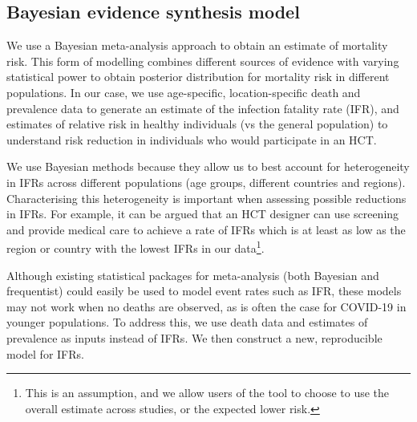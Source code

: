 \documentclass{article}
\begin{document}
\subsection{Bayesian evidence synthesis model}

We use a Bayesian meta-analysis approach to obtain an estimate of mortality risk. This form of modelling combines different sources of evidence with varying statistical power to obtain posterior distribution for mortality risk in different populations. In our case, we use age-specific, location-specific death and prevalence data to generate an estimate of the infection fatality rate (IFR), and estimates of relative risk in healthy individuals (vs the general population) to understand risk reduction in individuals who would participate in an HCT. 

We use Bayesian methods because they allow us to best account for heterogeneity in IFRs across different populations (age groups, different countries and regions). Characterising this heterogeneity is important when assessing possible reductions in IFRs. For example, it can be argued that an HCT designer can use screening and provide medical care to achieve a rate of IFRs which is at least as low as the region or country with the lowest IFRs in our data\footnote{This is an assumption, and we allow users of the tool to choose to use the overall estimate across studies, or the expected lower risk.}.

Although existing statistical packages for meta-analysis (both Bayesian and frequentist) could easily be used to model event rates such as IFR\cite{wiecek_baggr_2020, carpenter_hierarchical_2016}, these models may not work when no deaths are observed, as is often the case for COVID-19 in younger populations. To address this, we use death data and estimates of prevalence as inputs instead of IFRs. We then construct a new, reproducible model for IFRs.
\end{document}
